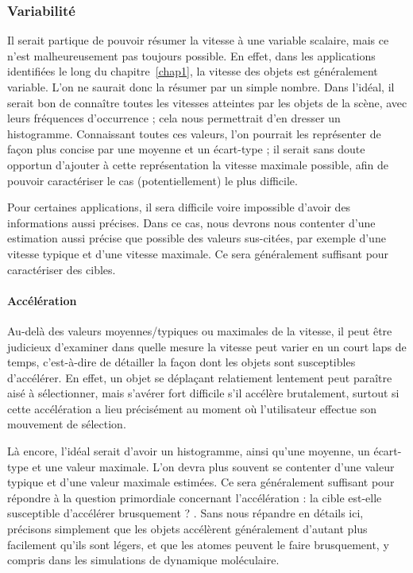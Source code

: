 	\subsubsection{Variabilité}
	Il serait partique de pouvoir résumer la vitesse à une variable scalaire, mais ce n'est malheureusement pas toujours possible. En effet, dans les applications identifiées le long du chapitre~\ref{chap1}, la vitesse des objets est généralement variable. L'on ne saurait donc la résumer par un simple nombre. Dans l'idéal, il serait bon de connaître toutes les vitesses atteintes par les objets de la scène, avec leurs fréquences d'occurrence ; cela nous permettrait d'en dresser un histogramme. Connaissant toutes ces valeurs, l'on pourrait les représenter de façon plus concise par une moyenne et un écart-type ; il serait sans doute opportun d'ajouter à cette représentation la vitesse maximale possible, afin de pouvoir caractériser le cas (potentiellement) le plus difficile.
	
	Pour certaines applications, il sera difficile voire impossible d'avoir des informations aussi précises. Dans ce cas, nous devrons nous contenter d'une estimation aussi précise que possible des valeurs sus-citées, par exemple d'une vitesse \og typique \fg{} et d'une vitesse maximale. Ce sera généralement suffisant pour caractériser des cibles.
	
	\paragraph{Accélération}
	Au-delà des valeurs moyennes/typiques ou maximales de la vitesse, il peut être judicieux d'examiner dans quelle mesure la vitesse peut varier en un court laps de temps, c'est-à-dire de détailler la façon dont les objets sont susceptibles d'accélérer. En effet, un objet se déplaçant relatiement lentement peut paraître aisé à sélectionner, mais s'avérer fort difficile s'il accélère brutalement, surtout si cette accélération a lieu précisément au moment où l'utilisateur effectue son mouvement de sélection.
	
	Là encore, l'idéal serait d'avoir un histogramme, ainsi qu'une moyenne, un écart-type et une valeur maximale. L'on devra plus souvent se contenter d'une valeur typique et d'une valeur maximale estimées. Ce sera généralement suffisant pour répondre à la question primordiale concernant l'accélération : \og la cible est-elle susceptible d'accélérer brusquement ? \fg{}. Sans nous répandre en détails ici, précisons simplement que les objets accélèrent généralement d'autant plus facilement qu'ils sont légers, et que les atomes peuvent le faire brusquement, y compris dans les simulations de dynamique moléculaire.
   
